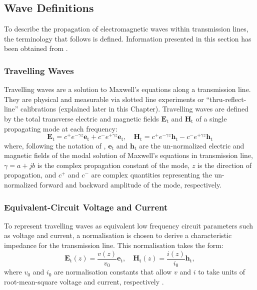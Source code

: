 \documentclass[../thesis/thesis.tex]{subfiles}
\begin{document}
\subsection{Wave Definitions}

To describe the propagation of electromagnetic waves within transmission lines, the terminology that follows is defined. Information presented in this section has been obtained from \cite{Williams_2013,Marcuvitz_1951,Marks_1992,Kurokawa_1965,Williams_2001}.

\subsubsection{Travelling Waves}

Travelling waves are a solution to Maxwell's equations along a transmission line. They are physical and measurable via slotted line experiments or ``thru-reflect-line'' calibrations (explained later in this Chapter). Travelling waves are defined by the total transverse electric and magnetic fields $\bm{E}_\textrm{t}$ and $\bm{H}_\textrm{t}$ of a single propagating mode at each frequency:
\begin{equation}
\bm{E}_\textrm{t}=c^+e^{-\gamma z}\bm{e}_\textrm{t}+c^-e^{+\gamma z}\bm{e}_\textrm{t},\quad
\bm{H}_\textrm{t}=c^+e^{-\gamma z}\bm{h}_\textrm{t}-c^-e^{+\gamma z}\bm{h}_\textrm{t}
\end{equation}
where, following the notation of \cite{Williams_2001}, $\bm{e}_\textrm{t}$ and $\bm{h}_\textrm{t}$ are the un-normalized electric and magnetic fields of the modal solution of Maxwell’s equations in transmission line, $\gamma=a+jb$ is the complex propagation constant of the mode, $z$ is the direction of propagation, and $c^+$ and $c^-$ are complex quantities representing the un-normalized forward and backward amplitude of the mode, respectively.

\subsubsection{Equivalent-Circuit Voltage and Current}

To represent travelling waves as equivalent low frequency circuit parameters such as voltage and current, a normalisation is chosen to derive a characteristic impedance for the transmission line. This normalisation takes the form:
\begin{equation}
\bm{E}_\textrm{t}(z)=\dfrac{v(z)}{v_0}\bm{e}_\textrm{t},\quad
\bm{H}_\textrm{t}(z)=\dfrac{i(z)}{i_0}\bm{h}_\textrm{t},
\end{equation}
where $v_0$ and $i_0$ are normalisation constants that allow $v$ and $i$ to take units of root-mean-square voltage and current, respectively \cite{Williams_2001}.
\end{document}
